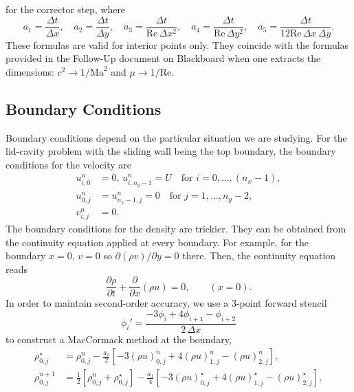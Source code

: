 \documentclass[11pt]{article}
\newcommand{\Ma}{\text{Ma}}
\newcommand{\Rey}{\text{Re}}
\newcommand{\ind}[4]{{#1}^{#2}_{#3,#4}}
\begin{document}
for the corrector step, where
\begin{equation}
a_1 = \frac{\Delta t}{\Delta x},\quad a_2 = \frac{\Delta t}{\Delta y},\quad a_3 = \frac{\Delta t}{\Rey\,\Delta x^2},\quad a_4 = \frac{\Delta t}{\Rey\,\Delta y^2},\quad a_5 = \frac{\Delta t}{12\Rey\,\Delta x\,\Delta y}.
\end{equation}
These formulas are valid for interior points only. They coincide with the formulas provided in the Follow-Up document on Blackboard when one extracts the dimensions: $c^2\longrightarrow 1/\Ma^2$ and $\mu \longrightarrow 1/\Rey$.

\subsection{Boundary Conditions}

Boundary conditions depend on the particular situation we are studying. For the lid-cavity problem with the sliding wall being the top boundary, the boundary conditions for the velocity are
\begin{align}
\ind{u}{n}{i}{0} &= 0,\, \ind{u}{n}{i}{n_y-1} = U\quad\text{for }i = 0,\hdots,(n_x-1),\\
\ind{u}{n}{0}{j} &= \ind{u}{n}{n_x-1}{j} = 0\quad \text{for }j = 1,\hdots,n_y-2,\\
\ind{v}{n}{i}{j} &= 0.
\end{align}
The boundary conditions for the density are trickier. They can be obtained from the continuity equation applied at every boundary. For example, for the boundary $x = 0$, $v = 0$ so $\partial(\rho v)/\partial y = 0$ there. Then, the continuity equation reads
\begin{equation}
\frac{\partial \rho}{\partial t} + \frac{\partial}{\partial x}\left(\rho u\right) = 0,\qquad (x = 0).
\end{equation}
In order to maintain second-order accuracy, we use a 3-point forward stencil
\begin{equation}
\phi_i' = \frac{-3\phi_i + 4\phi_{i+1} - \phi_{i+2}}{2\,\Delta x}
\end{equation}
to construct a MacCormack method at the boundary,
\begin{align}
\ind{\rho}{\star}{0}{j} &= \ind{\rho}{n}{0}{j} 
- \frac{a_1}{2}\left[-3\ind{(\rho u)}{n}{0}{j} + 4\ind{(\rho u)}{n}{1}{j} - \ind{(\rho u)}{n}{2}{j}\right],\\
\ind{\rho}{n+1}{0}{j} &= \frac{1}{2}\left[ \ind{\rho}{n}{0}{j} + \ind{\rho}{\star}{0}{j} \right] 
- \frac{a_1}{4}\left[-3\ind{(\rho u)}{\star}{0}{j} + 4\ind{(\rho u)}{\star}{1}{j} - \ind{(\rho u)}{\star}{2}{j}\right],
\end{align}
\end{document}
